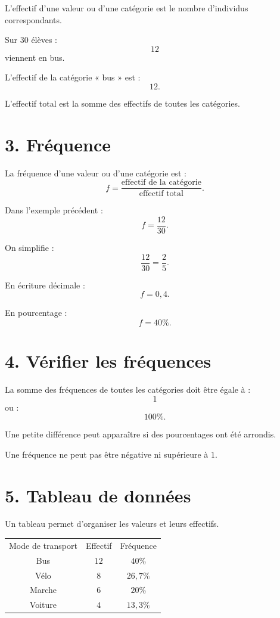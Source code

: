 L'effectif d'une valeur ou d'une catégorie est le nombre d'individus correspondants.

\begin{exemple}
Sur $30$ élèves :
\[
12
\]
viennent en bus.

L'effectif de la catégorie « bus » est :
\[
\boxed{12}.
\]
\end{exemple}

L'effectif total est la somme des effectifs de toutes les catégories.

\section{3. Fréquence}

La fréquence d'une valeur ou d'une catégorie est :
\[
\boxed{
f=\dfrac{\text{effectif de la catégorie}}{\text{effectif total}}
}.
\]

Dans l'exemple précédent :
\[
f=\dfrac{12}{30}.
\]

On simplifie :
\[
\dfrac{12}{30}=\dfrac25.
\]

En écriture décimale :
\[
f=0{,}4.
\]

En pourcentage :
\[
f=40\%.
\]

\section{4. Vérifier les fréquences}

La somme des fréquences de toutes les catégories doit être égale à :
\[
1
\]
ou :
\[
100\%.
\]

Une petite différence peut apparaître si des pourcentages ont été arrondis.

\begin{attention}
Une fréquence ne peut pas être négative ni supérieure à $1$.
\end{attention}

\section{5. Tableau de données}

Un tableau permet d'organiser les valeurs et leurs effectifs.

\begin{tabular}{c|c|c}
Mode de transport & Effectif & Fréquence \\
Bus & $12$ & $40\%$ \\
Vélo & $8$ & $26{,}7\%$ \\
Marche & $6$ & $20\%$ \\
Voiture & $4$ & $13{,}3\%$ \\
\end{tabular}

